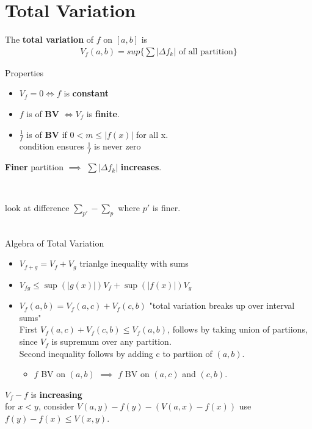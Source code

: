 \documentclass[12pt]{article}
\newcommand{\bt}[1]{\textbf{#1}} %
\newcommand{\eq}[1]{\begin{align*}#1\end{align*}} %
\newcommand{\gray}[1]{\textcolor[gray]{0.5}{#1}} %
\begin{document}
{\section{Total Variation}

The \bt{total variation} of $f$ on $[a, b]$ is 
\eq{V_f(a, b) = sup\{\sum |\Delta f_k| \text{ of all partition} \}}

Properties
\begin{itemize}
\item $V_f = 0 \iff f$ is \bt{constant}
\item $f$ is of \bt{BV} $\iff V_f$ is \bt{finite}.
\item $\frac{1}{f}$ is of \bt{BV} if $0 < m \leq |f(x)|$ for all x.\\
\gray{condition ensures $\frac{1}{f}$ is never zero}
\end{itemize}

\centerline{\bt{Finer} partition $\implies$ $\sum |\Delta f_k|$ \bt{increases}.}\\
\centerline{\gray{look at difference $\sum_{p'} - \sum_p$ where $p'$ is finer.}}\\

Algebra of Total Variation
\begin{itemize}
    \item $V_{f+g} = V_f + V_g$ \gray{trianlge inequality with sums}
    \item $V_{fg} \leq \sup(|g(x)|) V_f + \sup(|f(x)|) V_g$
    \item $V_f(a, b) = V_f(a, c) + V_f(c, b)$ "total variation breaks up over interval sums"\\
    \gray{First $V_f(a, c) + V_f(c, b) \leq V_f(a, b)$, follows by taking union of partiions, since $V_f$ is supremum over any partition.\\
    Second inequality follows by adding c to partiion of $(a, b)$.}
\begin{itemize}
    \item $f$ BV on $(a, b)$ $\implies$ $f$ BV on $(a, c)$ and $(c, b)$.
\end{itemize}
\end{itemize}


 $V_f - f$ is \bt{increasing} \\
\gray{for $x < y$, 
consider $V(a, y) - f(y) - (V(a, x) - f(x))$ use $f(y) - f(x) \leq V(x, y)$.}\\
\ \\

}
\end{document}
